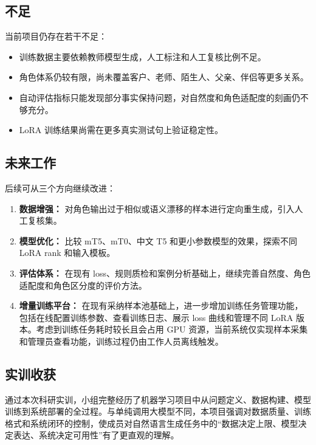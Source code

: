 \documentclass[12pt,a4paper]{ctexart}
\begin{document}
\subsection{不足}

当前项目仍存在若干不足：

\begin{itemize}[leftmargin=2em]
  \item 训练数据主要依赖教师模型生成，人工标注和人工复核比例不足。
  \item 角色体系仍较有限，尚未覆盖客户、老师、陌生人、父亲、伴侣等更多关系。
  \item 自动评估指标只能发现部分事实保持问题，对自然度和角色适配度的刻画仍不够充分。
  \item LoRA 训练结果尚需在更多真实测试句上验证稳定性。
\end{itemize}

\subsection{未来工作}

后续可从三个方向继续改进：

\begin{enumerate}[leftmargin=2em]
  \item \textbf{数据增强：} 对角色输出过于相似或语义漂移的样本进行定向重生成，引入人工复核集。
  \item \textbf{模型优化：} 比较 mT5、mT0、中文 T5 和更小参数模型的效果，探索不同 LoRA rank 和输入模板。
  \item \textbf{评估体系：} 在现有 loss、规则质检和案例分析基础上，继续完善自然度、角色适配度和角色区分度的评价方法。
  \item \textbf{增量训练平台：} 在现有采纳样本池基础上，进一步增加训练任务管理功能，包括在线配置训练参数、查看训练日志、展示 loss 曲线和管理不同 LoRA 版本。考虑到训练任务耗时较长且会占用 GPU 资源，当前系统仅实现样本采集和管理员查看功能，训练过程仍由工作人员离线触发。
\end{enumerate}

\subsection{实训收获}

通过本次科研实训，小组完整经历了机器学习项目中从问题定义、数据构建、模型训练到系统部署的全过程。与单纯调用大模型不同，本项目强调对数据质量、训练格式和系统闭环的控制，使成员对自然语言生成任务中的“数据决定上限、模型决定表达、系统决定可用性”有了更直观的理解。
\end{document}
